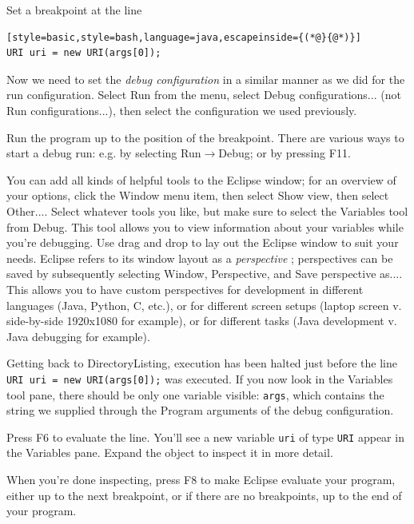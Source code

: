 \documentclass[12pt, a4paper, twoside, openany, titlepage]{book}
\begin{document}
Set a breakpoint at the line
\begin{lstlisting}[style=basic,style=bash,language=java,escapeinside={(*@}{@*)}]
URI uri = new URI(args[0]);
\end{lstlisting}

Now we need to set the \textit{debug configuration} in a similar manner as we did for the run configuration.
Select \textsf{Run} from the menu, select \textsf{Debug configurations...}
(not \textsf{Run configurations...}), then select the configuration we used
previously.

Run the program up to the position of the breakpoint. There are various ways
to start a debug run: e.g. by selecting \textsf{Run}$\rightarrow$\textsf
{Debug}; or by pressing \textsf{F11}.

You can add all kinds of helpful tools to the Eclipse window; for an
overview of your options, click the \textsf{Window} menu item, then select
\textsf{Show view}, then select \textsf{Other...}. Select whatever tools you
like, but make sure to select the \textsf{Variables} tool from \textsf
{Debug}. This tool allows you to view information about your variables while
you're debugging. Use drag and drop to lay out the Eclipse window to suit
your needs. Eclipse refers to its window layout as a \textit{perspective}
; perspectives can be saved by subsequently
selecting \textsf{Window}, \textsf{Perspective}, and \textsf{Save
perspective as...}. This allows you to have custom perspectives for
development in different languages (Java, Python, C, etc.), or for different
screen setups (laptop screen v. side-by-side 1920x1080 for example), or for
different tasks (Java development v. Java debugging for example).

Getting back to \textsf{DirectoryListing}, execution has been halted just
before the line \texttt{URI uri = new URI(args[0]);} was executed. If you
now look in the \textsf{Variables} tool pane, there should be only one
variable visible: \texttt{args}, which contains the string we supplied
through the \textsf{Program arguments} of the debug configuration.

Press \textsf{F6} to evaluate the line. You'll see a new variable \texttt
{uri} of type \texttt{URI} appear in the \textsf{Variables} pane. Expand the
object to inspect it in more detail.

When you're done inspecting, press \textsf{F8} to make Eclipse evaluate your
program, either up to the next breakpoint, or if there are no breakpoints,
up to the end of your program.
\end{document}
